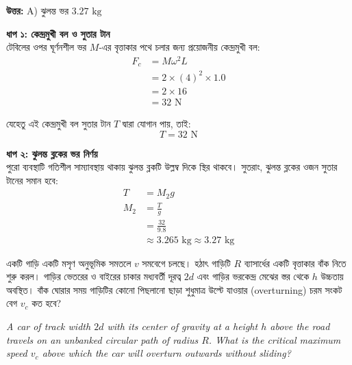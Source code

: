 \documentclass[12pt, a4paper]{article}
\begin{document}
\vspace{0.5em}
\begin{tcolorbox}[answerbox]
    \textbf{\color{success} উত্তর:} A) ঝুলন্ত ভর $3.27\text{ kg}$
\end{tcolorbox}
\vspace{1em}

\begin{tcolorbox}[solutionbox={সমাধান (Solution)}]
    \noindent
    \textbf{ধাপ ১: কেন্দ্রমুখী বল ও সুতার টান} \\
    টেবিলের ওপর ঘূর্ণনশীল ভর $M$-এর বৃত্তাকার পথে চলার জন্য প্রয়োজনীয় কেন্দ্রমুখী বল:
    \begin{align*}
        F_c &= M \omega^2 L \\
        &= 2 \times (4)^2 \times 1.0 \\
        &= 2 \times 16 \\
        &= 32\text{ N}
    \end{align*}
    
    যেহেতু এই কেন্দ্রমুখী বল সুতার টান $T$ দ্বারা যোগান পায়, তাই:
    \[ T = 32\text{ N} \]
    
    \vspace{0.5em}
    \noindent\textbf{ধাপ ২: ঝুলন্ত ব্লকের ভর নির্ণয়} \\
    পুরো ব্যবস্থাটি গতিশীল সাম্যাবস্থায় থাকায় ঝুলন্ত ব্লকটি উল্লম্ব দিকে স্থির থাকবে। 
    সুতরাং, ঝুলন্ত ব্লকের ওজন সুতার টানের সমান হবে:
    \begin{align*}
        T &= M_2 g \\
        M_2 &= \frac{T}{g} \\
        &= \frac{32}{9.8} \\
        &\approx 3.265\text{ kg} \approx \mathbf{3.27}\text{ kg}
    \end{align*}
\end{tcolorbox}

\newpage

\begin{tcolorbox}[questionbox={প্রশ্ন (Question) 16}]
    \noindent
    একটি গাড়ি একটি মসৃণ অনুভূমিক সমতলে $v$ সমবেগে চলছে। হঠাৎ গাড়িটি $R$ ব্যাসার্ধের একটি বৃত্তাকার বাঁক নিতে শুরু করল। গাড়ির ভেতরের ও বাইরের চাকার মধ্যবর্তী দূরত্ব $2d$ এবং গাড়ির ভরকেন্দ্র মেঝের স্তর থেকে $h$ উচ্চতায় অবস্থিত। বাঁক ঘোরার সময় গাড়িটির কোনো পিছলানো ছাড়া শুধুমাত্র উল্টে যাওয়ার (overturning) চরম সংকট বেগ $v_c$ কত হবে?
    
    \vspace{0.8em}
    \begin{english}
    \noindent\textit{\color{darkgray}
    A car of track width $2d$ with its center of gravity at a height $h$ above the road travels on an unbanked circular path of radius $R$. What is the critical maximum speed $v_c$ above which the car will overturn outwards without sliding?
    }
    \end{english}
\end{tcolorbox}
\end{document}

